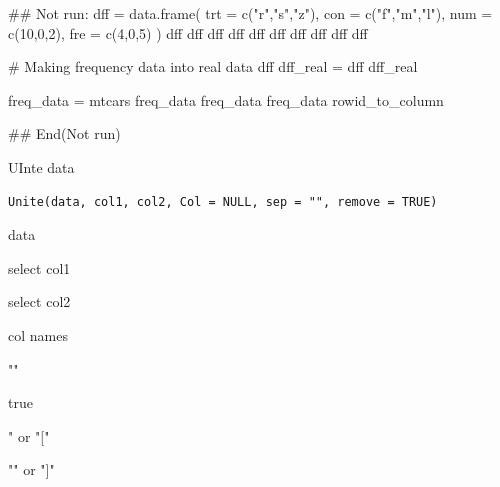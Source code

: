 \documentclass[a4paper]{book}
\begin{document}
%
\begin{Examples}
\begin{ExampleCode}

## Not run: 
dff = data.frame(
  trt = c("r","s","z"),
  con = c("f","m","l"),
  num = c(10,0,2),
  fre = c(4,0,5) )
dff
dff %
dff %
dff %
dff %
dff %
dff %
dff %
dff %
dff %

# Making frequency data into real data
dff %
 dff_real =  dff %
 dff_real

 freq_data =  mtcars %
 freq_data%
 freq_data%
 freq_data%
rowid_to_column

## End(Not run)

\end{ExampleCode}
\end{Examples}
%
\begin{Description}
UInte data
\end{Description}
%
\begin{Usage}
\begin{verbatim}
Unite(data, col1, col2, Col = NULL, sep = "", remove = TRUE)
\end{verbatim}
\end{Usage}
%
\begin{Arguments}
\begin{ldescription}
\item[\code{data}] data

\item[\code{col1}] select col1

\item[\code{col2}] select col2

\item[\code{Col}] col names

\item[\code{sep}] ""

\item[\code{remove}] true

\item[\code{left}] " or "["

\item[\code{right}] ""  or  "]"
\end{ldescription}
\end{Arguments}
\end{document}
